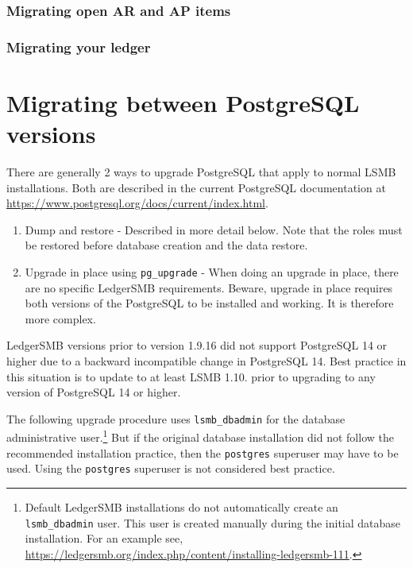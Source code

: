 \subsubsection{Migrating open AR and AP items}
\label{subsec-migration-others-open-items}

\subsubsection{Migrating your ledger}
\label{subsec-migration-others-ledger}

\section{Migrating between PostgreSQL versions}
\label{sec-migration-postrgesql}

There are generally 2 ways to upgrade PostgreSQL that apply to normal LSMB installations. 
Both are described in the current PostgreSQL documentation at \url{https://www.postgresql.org/docs/current/index.html}.
\begin{enumerate}
    \item Dump and restore -
        Described in more detail below.
        Note that the roles must be restored before database creation and the data restore.
    \item Upgrade in place using \texttt{pg\_upgrade} - When doing an upgrade in place, there are no specific LedgerSMB requirements.
        Beware, upgrade in place requires both versions of the PostgreSQL to be installed and working. It is therefore more complex.
\end{enumerate}

LedgerSMB versions prior to version 1.9.16 did not support PostgreSQL 14 or higher due to a backward incompatible change in PostgreSQL 14.
Best practice in this situation is to update to at least LSMB 1.10. prior to upgrading to any version of PostgreSQL 14 or higher.

The following upgrade procedure uses \texttt{lsmb\_dbadmin} for the database administrative user.\footnote{Default LedgerSMB installations do not automatically create an  \texttt{lsmb\_dbadmin} user. This user is created manually during the initial database installation. For an example see, \url{https://ledgersmb.org/index.php/content/installing-ledgersmb-111}.}
But if the original database installation did not follow the recommended installation practice, then the \texttt{postgres} superuser may have to be used. Using the \texttt{postgres} superuser is not considered best practice.

